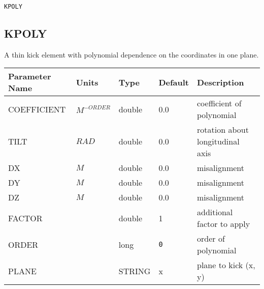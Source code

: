 \begin{latexonly}
\newpage
\begin{center}{\Large\verb|KPOLY|}\end{center}
\end{latexonly}\subsection{KPOLY}
A thin kick element with polynomial dependence on the coordinates in one plane.
\\
\begin{tabular}{|l|l|l|l|p{\descwidth}|} \hline
Parameter Name & Units & Type & Default & Description \\ \hline 
COEFFICIENT & $M^{-ORDER}$ & double &  0.0 & coefficient of polynomial  \\ \hline 
TILT & $RAD$ & double &  0.0 & rotation about longitudinal axis  \\ \hline 
DX & $M$ & double &  0.0 & misalignment  \\ \hline 
DY & $M$ & double &  0.0 & misalignment  \\ \hline 
DZ & $M$ & double &  0.0 & misalignment  \\ \hline 
FACTOR &  & double &   1 & additional factor to apply  \\ \hline 
ORDER &  & long &  \verb|0| & order of polynomial  \\ \hline 
PLANE &  & STRING &   x               & plane to kick (x, y)  \\ \hline 
\end{tabular}

